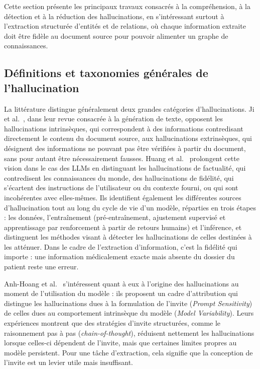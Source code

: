 Cette section présente les principaux travaux consacrés à la compréhension, à la détection et à la réduction des hallucinations, en s'intéressant surtout à l'extraction structurée d'entités et de relations, où chaque information extraite doit être fidèle au document source pour pouvoir alimenter un graphe de connaissances.

\subsection{Définitions et taxonomies générales de l'hallucination}

La littérature distingue généralement deux grandes catégories d'hallucinations. Ji et al.~\cite{ji2023survey}, dans leur revue consacrée à la génération de texte, opposent les hallucinations intrinsèques, qui correspondent à des informations contredisant directement le contenu du document source, aux hallucinations extrinsèques, qui désignent des informations ne pouvant pas être vérifiées à partir du document, sans pour autant être nécessairement fausses. Huang et al.~\cite{huang2023survey} prolongent cette vision dans le cas des LLMs en distinguant les hallucinations de factualité, qui contredisent les connaissances du monde, des hallucinations de fidélité, qui s'écartent des instructions de l'utilisateur ou du contexte fourni, ou qui sont incohérentes avec elles-mêmes. Ils identifient également les différentes sources d'hallucination tout au long du cycle de vie d'un modèle, réparties en trois étapes : les données, l'entraînement (pré-entraînement, ajustement supervisé et apprentissage par renforcement à partir de retours humains) et l'inférence, et distinguent les méthodes visant à détecter les hallucinations de celles destinées à les atténuer. Dans le cadre de l'extraction d'information, c'est la fidélité qui importe : une information médicalement exacte mais absente du dossier du patient reste une erreur.

Anh-Hoang et al.~\cite{anhhoang2025survey} s'intéressent quant à eux à l'origine des hallucinations au moment de l'utilisation du modèle : ils proposent un cadre d'attribution qui distingue les hallucinations dues à la formulation de l'invite (\textit{Prompt Sensitivity}) de celles dues au comportement intrinsèque du modèle (\textit{Model Variability}). Leurs expériences montrent que des stratégies d'invite structurées, comme le raisonnement pas à pas (\textit{chain-of-thought}), réduisent nettement les hallucinations lorsque celles-ci dépendent de l'invite, mais que certaines limites propres au modèle persistent. Pour une tâche d'extraction, cela signifie que la conception de l'invite est un levier utile mais insuffisant.

